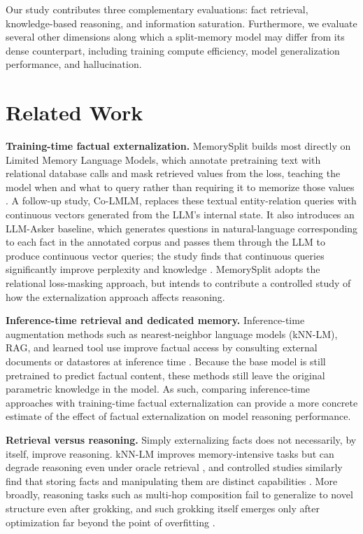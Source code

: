 \documentclass{article}
\begin{document}
Our study contributes three complementary evaluations: fact retrieval, knowledge-based reasoning, and information saturation. Furthermore, we evaluate several other dimensions along which a split-memory model may differ from its dense counterpart, including training compute efficiency, model generalization performance, and hallucination.


\section{Related Work}
\textbf{Training-time factual externalization.} MemorySplit builds most directly on Limited Memory Language Models, which annotate pretraining text with relational database calls and mask retrieved values from the loss, teaching the model when and what to query rather than requiring it to memorize those values \citep{zhao2025lmlm}. A follow-up study, Co-LMLM, replaces these textual entity-relation queries with continuous vectors generated from the LLM's internal state. It also introduces an LLM-Asker baseline, which generates questions in natural-language corresponding to each fact in the annotated corpus and passes them through the LLM to produce continuous vector queries; the study finds that continuous queries significantly improve perplexity and knowledge \citep{feldman2026colmlm}. MemorySplit adopts the relational loss-masking approach, but intends to contribute a controlled study of how the externalization approach affects reasoning.

\textbf{Inference-time retrieval and dedicated memory.} Inference-time augmentation methods such as nearest-neighbor language models (kNN-LM), RAG, and learned tool use improve factual access by consulting external documents or datastores at inference time \citep{khandelwal2020knnlm,lewis2020rag,schick2023toolformer}. Because the base model is still pretrained to predict factual content, these methods still leave the original parametric knowledge in the model. As such, comparing inference-time approaches with training-time factual externalization can provide a more concrete estimate of the effect of factual externalization on model reasoning performance.

\textbf{Retrieval versus reasoning.} Simply externalizing facts does not necessarily, by itself, improve reasoning. kNN-LM improves memory-intensive tasks but can degrade reasoning even under oracle retrieval \citep{geng2025great}, and controlled studies similarly find that storing facts and manipulating them are distinct capabilities \citep{allenzhu2023manipulation}. More broadly, reasoning tasks such as multi-hop composition fail to generalize to novel structure even after grokking, and such grokking itself emerges only after optimization far beyond the point of overfitting \citep{wang2024grokked}.
\end{document}
